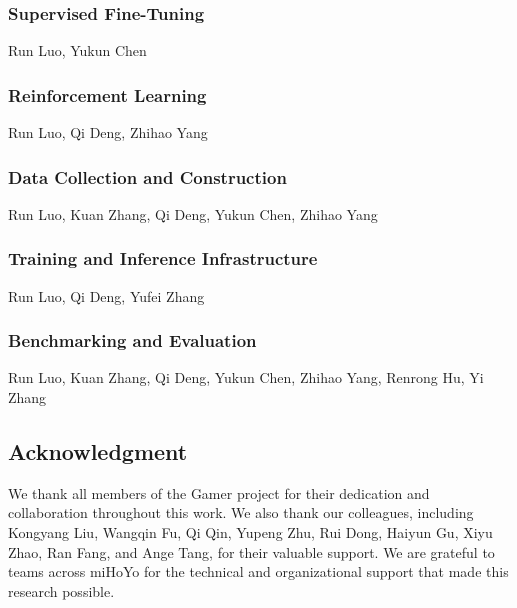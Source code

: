 \subsubsection*{Supervised Fine-Tuning}
Run Luo, Yukun Chen
\vspace{-5pt}
\subsubsection*{Reinforcement Learning}
Run Luo, Qi Deng, Zhihao Yang
\vspace{-5pt}
\subsubsection*{Data Collection and Construction}
Run Luo, Kuan Zhang, Qi Deng, Yukun Chen, Zhihao Yang
\vspace{-5pt}
\subsubsection*{Training and Inference Infrastructure}
Run Luo, Qi Deng, Yufei Zhang
\vspace{-5pt}
\subsubsection*{Benchmarking and Evaluation}
Run Luo, Kuan Zhang, Qi Deng, Yukun Chen, Zhihao Yang, Renrong Hu, Yi Zhang

\subsection*{Acknowledgment}
We thank all members of the Gamer project for their dedication and collaboration throughout this work. We also thank our colleagues, including Kongyang Liu, Wangqin Fu, Qi Qin, Yupeng Zhu, Rui Dong, Haiyun Gu, Xiyu Zhao, Ran Fang, and Ange Tang, for their valuable support. We are grateful to teams across miHoYo for the technical and organizational support that made this research possible.


